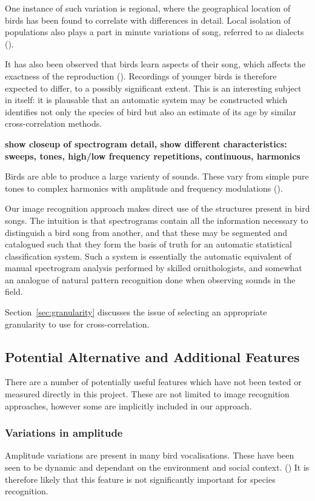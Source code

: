One instance of such variation is regional, where the geographical
location of birds has been found to correlate with differences in detail.
Local isolation of populations also plays a part in minute variations of song,
referred to as dialects (\textcite{podos2007}).

It has also been observed that birds learn aspects of their song, which affects
the exactness of the reproduction (\textcite{Krood1983}).
Recordings of younger birds is therefore expected to differ, to a possibly
significant extent.
This is an interesting subject in itself: it is plausable that an automatic
system may be constructed which identifies not only the species of bird but also
an estimate of its age by similar cross-correlation methods.

\textbf{show closeup of spectrogram detail, show different characteristics:
sweeps, tones, high/low frequency repetitions, continuous, harmonics}

Birds are able to produce a large varienty of sounds.
These vary from simple pure tones to complex harmonics with amplitude and
frequency modulations (\textcite{fager2004}).

Our image recognition approach makes direct use of the structures present
in bird songs.
The intuition is that spectrograms contain all the information necessary to
distinguish a bird song from another, and that these may be segmented and
catalogued such that they form the basis of truth for an automatic statistical
classification system.
Such a system is essentially the automatic equivalent of manual spectrogram 
analysis performed by skilled ornithologists, and somewhat an analogue of natural
pattern recognition done when observing sounds in the field.

Section~\ref{sec:granularity} discusses the issue of selecting an appropriate
granularity to use for cross-correlation.

\subsection{Potential Alternative and Additional Features}
There are a number of potentially useful features which have not been tested or
measured directly in this project.
These are not limited to image recognition approaches, however some are
implicitly included in our approach.

\subsubsection{Variations in amplitude}
Amplitude variations are present in many bird vocalisations.
These have been seen to be dynamic and dependant on the environment and social
context. (\textcite{brumm2004})
It is therefore likely that this feature is not significantly important for
species recognition.

